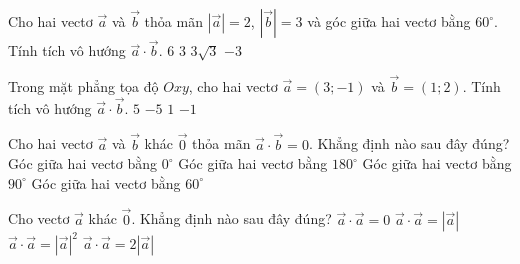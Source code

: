 \begin{ex}%
Cho hai vectơ $\overrightarrow{a}$ và $\overrightarrow{b}$ thỏa mãn $|\overrightarrow{a}|=2$, $|\overrightarrow{b}|=3$ và góc giữa hai vectơ bằng $60^\circ$. Tính tích vô hướng $\overrightarrow{a}\cdot\overrightarrow{b}$.
\choice
{$6$}
{\True $3$}
{$3\sqrt{3}$}
{$-3$}
\end{ex}

\begin{ex}%
Trong mặt phẳng tọa độ $Oxy$, cho hai vectơ $\overrightarrow{a}=(3;-1)$ và $\overrightarrow{b}=(1;2)$. Tính tích vô hướng $\overrightarrow{a}\cdot\overrightarrow{b}$.
\choice
{$5$}
{$-5$}
{\True $1$}
{$-1$}
\end{ex}

\begin{ex}%
Cho hai vectơ $\overrightarrow{a}$ và $\overrightarrow{b}$ khác $\overrightarrow{0}$ thỏa mãn $\overrightarrow{a}\cdot\overrightarrow{b}=0$. Khẳng định nào sau đây đúng?
\choice
{Góc giữa hai vectơ bằng $0^\circ$}
{Góc giữa hai vectơ bằng $180^\circ$}
{\True Góc giữa hai vectơ bằng $90^\circ$}
{Góc giữa hai vectơ bằng $60^\circ$}
\end{ex}

\begin{ex}%
Cho vectơ $\overrightarrow{a}$ khác $\overrightarrow{0}$. Khẳng định nào sau đây đúng?
\choice
{$\overrightarrow{a}\cdot\overrightarrow{a}=0$}
{$\overrightarrow{a}\cdot\overrightarrow{a}=|\overrightarrow{a}|$}
{\True $\overrightarrow{a}\cdot\overrightarrow{a}=|\overrightarrow{a}|^2$}
{$\overrightarrow{a}\cdot\overrightarrow{a}=2|\overrightarrow{a}|$}
\end{ex}

